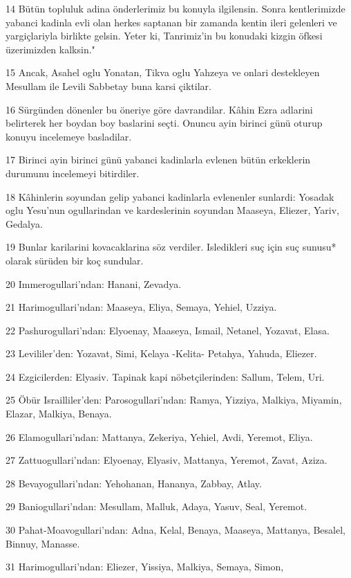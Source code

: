 \par 14 Bütün topluluk adina önderlerimiz bu konuyla ilgilensin. Sonra kentlerimizde yabanci kadinla evli olan herkes saptanan bir zamanda kentin ileri gelenleri ve yargiçlariyla birlikte gelsin. Yeter ki, Tanrimiz'in bu konudaki kizgin öfkesi üzerimizden kalksin."
\par 15 Ancak, Asahel oglu Yonatan, Tikva oglu Yahzeya ve onlari destekleyen Mesullam ile Levili Sabbetay buna karsi çiktilar.
\par 16 Sürgünden dönenler bu öneriye göre davrandilar. Kâhin Ezra adlarini belirterek her boydan boy baslarini seçti. Onuncu ayin birinci günü oturup konuyu incelemeye basladilar.
\par 17 Birinci ayin birinci günü yabanci kadinlarla evlenen bütün erkeklerin durumunu incelemeyi bitirdiler.
\par 18 Kâhinlerin soyundan gelip yabanci kadinlarla evlenenler sunlardi: Yosadak oglu Yesu'nun ogullarindan ve kardeslerinin soyundan Maaseya, Eliezer, Yariv, Gedalya.
\par 19 Bunlar karilarini kovacaklarina söz verdiler. Isledikleri suç için suç sunusu* olarak sürüden bir koç sundular.
\par 20 Immerogullari'ndan: Hanani, Zevadya.
\par 21 Harimogullari'ndan: Maaseya, Eliya, Semaya, Yehiel, Uzziya.
\par 22 Pashurogullari'ndan: Elyoenay, Maaseya, Ismail, Netanel, Yozavat, Elasa.
\par 23 Levililer'den: Yozavat, Simi, Kelaya -Kelita- Petahya, Yahuda, Eliezer.
\par 24 Ezgicilerden: Elyasiv. Tapinak kapi nöbetçilerinden: Sallum, Telem, Uri.
\par 25 Öbür Israilliler'den: Parosogullari'ndan: Ramya, Yizziya, Malkiya, Miyamin, Elazar, Malkiya, Benaya.
\par 26 Elamogullari'ndan: Mattanya, Zekeriya, Yehiel, Avdi, Yeremot, Eliya.
\par 27 Zattuogullari'ndan: Elyoenay, Elyasiv, Mattanya, Yeremot, Zavat, Aziza.
\par 28 Bevayogullari'ndan: Yehohanan, Hananya, Zabbay, Atlay.
\par 29 Baniogullari'ndan: Mesullam, Malluk, Adaya, Yasuv, Seal, Yeremot.
\par 30 Pahat-Moavogullari'ndan: Adna, Kelal, Benaya, Maaseya, Mattanya, Besalel, Binnuy, Manasse.
\par 31 Harimogullari'ndan: Eliezer, Yissiya, Malkiya, Semaya, Simon,
